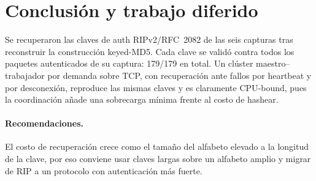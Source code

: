 \section{Conclusión y trabajo diferido}\label{sec:conclusion}
Se recuperaron las claves de auth RIPv2/RFC~2082 de las seis capturas tras reconstruir la construcción keyed-MD5. Cada clave se validó contra todos los paquetes autenticados de su captura: 179/179 en total. Un clúster maestro--trabajador por demanda sobre TCP, con recuperación ante fallos por heartbeat y por desconexión, reproduce las mismas claves y es claramente CPU-bound, pues la coordinación añade una sobrecarga mínima frente al costo de hashear.

\paragraph{Recomendaciones.} El costo de recuperación crece como el tamaño del alfabeto elevado a la longitud de la clave, por eso conviene usar claves largas sobre un alfabeto amplio y migrar de RIP a un protocolo con autenticación más fuerte.
